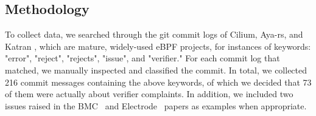


\subsection{Methodology}
To collect data, we searched through the git commit logs of Cilium, Aya-rs, and
    Katran , which are mature, widely-used eBPF projects, for instances of
    keywords: "error", "reject", "rejects", "issue", and "verifier."
For each commit log that matched, we manually inspected and classified the commit.
In total, we collected 216 commit messages containing the above keywords, of which we decided that 73 of them were actually about verifier complaints.
In addition, we included two issues raised in the BMC~\cite{BMC} and Electrode~\cite{Electrode} papers as examples when appropriate.

